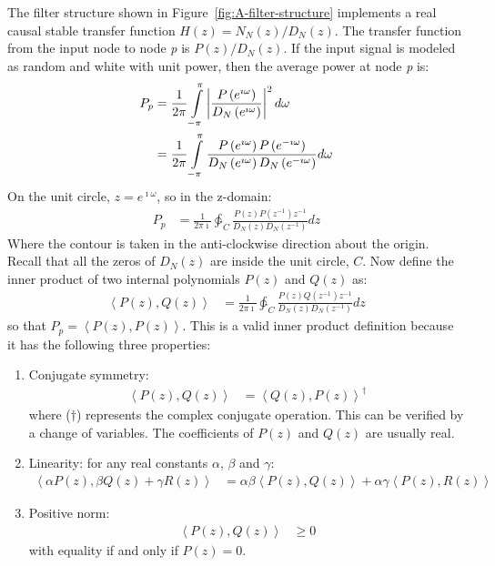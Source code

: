 \documentclass[a4paper,twoside,10pt,english]{report}
\begin{document}
The filter structure shown in Figure~\ref{fig:A-filter-structure} implements a
real causal stable transfer function
$H\left(z\right)=N_{N}\left(z\right)/D_{N}\left(z\right)$. The transfer function
from the input node to node \emph{p} is $P\left(z\right)/D_{N}\left(z\right)$. If
the input signal is modeled as random and white with unit power, then the
average power at node \emph{p} is:
\begin{align*}
P_{p} & = \frac{1}{2\pi}\intop_{-\pi}^{\pi}\left|\frac{P\left(e^{\imath\omega}\right)}{D_{N}\left(e^{\imath\omega}\right)}\right|^{2}d\omega\\
 & = \frac{1}{2\pi}\intop_{-\pi}^{\pi}\frac{P\left(e^{\imath\omega}\right)P\left(e^{-\imath\omega}\right)}{D_{N}\left(e^{\imath\omega}\right)D_{N}\left(e^{-\imath\omega}\right)}d\omega
\end{align*}
On the unit circle, $z=e^{\imath\omega}$, so in the z-domain:
\begin{align*}
P_{p} & = \frac{1}{2\pi \imath}\ointctrclockwise_{C}\frac{P\left(z\right)P\left(z^{-1}\right)z^{-1}}{D_{N}\left(z\right)D_{N}\left(z^{-1}\right)}dz
\end{align*}
Where the contour is taken in the anti-clockwise direction about the
origin. Recall that all the zeros of $D_{N}\left(z\right)$ are inside
the unit circle, $C$. Now define the inner product of two internal polynomials
$P\left(z\right)$ and $Q\left(z\right)$ as:
\begin{align*}
\left\langle P\left(z\right),Q\left(z\right)\right\rangle  & = \frac{1}{2\pi \imath}\ointctrclockwise_{C}\frac{P\left(z\right)Q\left(z^{-1}\right)z^{-1}}{D_{N}\left(z\right)D_{N}\left(z^{-1}\right)}dz
\end{align*}
so that $P_{p}=\left\langle P\left(z\right),P\left(z\right)\right\rangle $.
This is a valid inner product definition because it has the following
three properties:
\begin{enumerate}
\item Conjugate symmetry: 
\begin{align*}
\left\langle P\left(z\right),Q\left(z\right)\right\rangle  & = \left\langle Q\left(z\right),P\left(z\right)\right\rangle ^{\dagger}
\end{align*}
where ($\dagger$) represents the complex conjugate operation. This can
be verified by a change of variables. The coefficients of $P\left(z\right)$
and $Q\left(z\right)$ are usually real.
\item Linearity: for any real constants $\alpha$, $\beta$ and $\gamma$:
\begin{align*}
\left\langle \alpha P\left(z\right),\beta Q\left(z\right) +
             \gamma R\left(z\right)\right\rangle  
& = \alpha\beta\left\langle P\left(z\right),Q\left(z\right)\right\rangle + 
    \alpha\gamma\left\langle P\left(z\right),R\left(z\right)\right\rangle 
\end{align*}

\item Positive norm:
\begin{align*}
\left\langle P\left(z\right),Q\left(z\right)\right\rangle  & \geq 0
\end{align*}
 with equality if and only if $P\left(z\right)=0$.
\end{enumerate}
\end{document}
